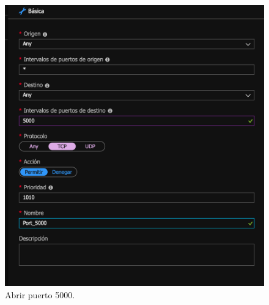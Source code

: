 \documentclass[10pt]{article}
\begin{document}
\begin{figure}[h!]
 \includegraphics[width=\linewidth]{./Web/Azure/Azure2.png}
 \caption{Abrir puerto 5000.}
\end{figure}
\end{document}

